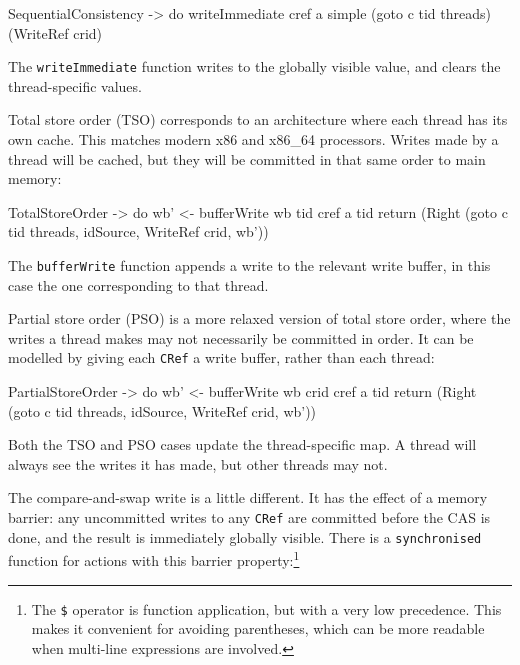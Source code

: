 \begin{haskellcode}
  SequentialConsistency -> do
    writeImmediate cref a
    simple (goto c tid threads) (WriteRef crid)
\end{haskellcode}

The \verb|writeImmediate| function writes to the globally visible
value, and clears the thread-specific values.

Total store order (TSO) corresponds to an architecture where each
thread has its own cache. This matches modern x86 and x86\_64
processors. Writes made by a thread will be cached, but they will be
committed in that same order to main memory:

\begin{haskellcode}
  TotalStoreOrder -> do
    wb' <- bufferWrite wb tid cref a tid
    return (Right (goto c tid threads, idSource, WriteRef crid, wb'))
\end{haskellcode}

The \verb|bufferWrite| function appends a write to the relevant write
buffer, in this case the one corresponding to that thread.

Partial store order (PSO) is a more relaxed version of total store order,
where the writes a thread makes may not necessarily be committed in
order. It can be modelled by giving each \verb|CRef| a write buffer,
rather than each thread:

\begin{haskellcode}
  PartialStoreOrder -> do
    wb' <- bufferWrite wb crid cref a tid
    return (Right (goto c tid threads, idSource, WriteRef crid, wb'))
\end{haskellcode}

Both the TSO and PSO cases update the thread-specific map. A thread
will always see the writes it has made, but other threads may not.

The compare-and-swap write is a little different. It has the effect of
a memory barrier: any uncommitted writes to any \verb|CRef| are
committed before the CAS is done, and the result is immediately
globally visible. There is a \verb|synchronised| function for actions
with this barrier property:\footnote{The \texttt{\$} operator is
  function application, but with a very low precedence. This makes it
  convenient for avoiding parentheses, which can be more readable when
  multi-line expressions are involved.}


